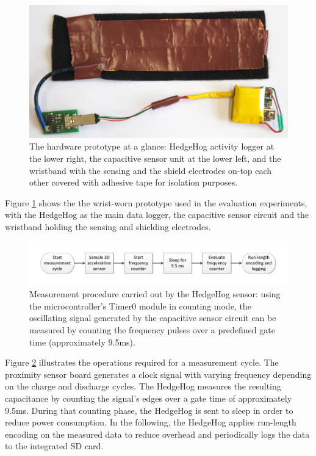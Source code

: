 \documentclass[runningheads,a4paper]{llncs}
\begin{document}
\begin{figure}
	\centering
		\includegraphics[width=1.00\textwidth]{Images/capacitive_sensor_wristband_2.jpg}
	\caption{The hardware prototype at a glance: HedgeHog activity logger at the lower right, the capacitive sensor unit at the lower left, and the wristband with the sensing and the shield electrodes on-top each other covered with adhesive tape for isolation purposes.}
	\label{fig:cap_sensor}
\end{figure}

Figure \ref{fig:cap_sensor} shows the the wrist-worn prototype used in the evaluation experiments, with the HedgeHog as the main data logger, the capacitive sensor circuit and the wristband holding the sensing and shielding electrodes.

\begin{figure}
	\centering
 		\includegraphics[trim=1cm 1cm 1cm 1cm,clip,width=\textwidth]{Images/pseudocode.pdf}
	\caption{Measurement procedure carried out by the HedgeHog sensor: using the microcontroller's Timer0 module in counting mode, the oscillating signal generated by the capacitive sensor circuit can be measured by counting the frequency pulses over a predefined gate time (approximately 9.5ms).}
	\label{fig:pseudocode}
\end{figure}

Figure \ref{fig:pseudocode} illustrates the operations required for a measurement cycle. The proximity sensor board generates a clock signal with varying frequency depending on the charge and discharge cycles. The HedgeHog measures the resulting capacitance by counting the signal's edges over a gate time of approximately 9.5ms. During that counting phase, the HedgeHog is sent to sleep in order to reduce power consumption. In the following, the HedgeHog applies run-length encoding on the measured data to reduce overhead and periodically logs the data to the integrated SD card.
\end{document}
